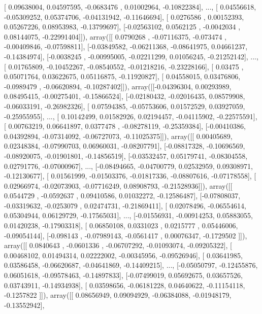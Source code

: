 \documentclass{article}
\begin{document}
       [ 0.09638004,  0.04597595, -0.0683476 ,  0.01002964, -0.10822384],
       ..., 
       [ 0.04556618, -0.05309252,  0.05374706, -0.04131942, -0.11646694],
       [ 0.0276586 ,  0.00152393,  0.05267226,  0.08953983, -0.13799697],
       [-0.02563102,  0.0562125 , -0.0042034 ,  0.08144075, -0.22991404]]), array([[ 0.0790268 , -0.07116375, -0.073474  , -0.00409846, -0.07598811],
       [-0.03849582, -0.06211368, -0.08641975,  0.04661237, -0.14384974],
       [-0.0038245 , -0.00995005, -0.02211299,  0.01056245, -0.21252142],
       ..., 
       [ 0.01765809, -0.10452267, -0.08540552, -0.01218216, -0.23228166],
       [ 0.03475   ,  0.05071764,  0.03622675,  0.05116875, -0.11920827],
       [ 0.04558015,  0.03476806, -0.0989479 , -0.06620894, -0.10287402]]), array([[-0.04396304,  0.00293989,  0.08495415, -0.00275401, -0.15866524],
       [-0.02180432, -0.02016435,  0.08579908, -0.06033191, -0.26982326],
       [ 0.07594385, -0.05753606,  0.01572529,  0.03927059, -0.25955955],
       ..., 
       [ 0.10142499,  0.01582926,  0.02194457, -0.04115902, -0.22575591],
       [ 0.00763219,  0.06641897,  0.0377478 , -0.08278119, -0.25359384],
       [-0.00410386,  0.04392894, -0.07314092, -0.06727073, -0.11025375]]), array([[ 0.00405689,  0.02348384, -0.07990703,  0.06960031, -0.08207791],
       [-0.08817328, -0.10696569, -0.08920075, -0.01901801, -0.14856519],
       [-0.03532457,  0.05179741, -0.08304558,  0.02791776, -0.07000967],
       ..., 
       [-0.08494665, -0.04700779,  0.02532959,  0.09308971, -0.12130677],
       [ 0.01561999, -0.01503376, -0.01817336, -0.08807616, -0.07178558],
       [ 0.02966974, -0.02073903, -0.07716249,  0.08908793, -0.21528936]]), array([[ 0.0544729 , -0.0592637 ,  0.09410586,  0.01032272, -0.12586487],
       [-0.07808037, -0.03319632, -0.0253079 ,  0.02474731, -0.21869411],
       [ 0.02078496, -0.06554614,  0.05304944,  0.06129729, -0.17565031],
       ..., 
       [-0.01556931, -0.00914253,  0.05883055,  0.01420238, -0.17903318],
       [ 0.06850108,  0.0331023 ,  0.0215777 ,  0.05446006, -0.09054144],
       [-0.098143  , -0.07989143, -0.0561417 ,  0.00076347, -0.1729502 ]]), array([[ 0.0840643 , -0.0601336 , -0.06707292, -0.01093074, -0.09205322],
       [ 0.00468102,  0.01494314,  0.02222002, -0.00345956, -0.09526946],
       [ 0.03641985,  0.03586458, -0.06620687, -0.04641869, -0.14409215],
       ..., 
       [-0.05050797, -0.12455876,  0.06051618, -0.09578463, -0.14897833],
       [-0.07499019,  0.05692675,  0.03657526,  0.03743911, -0.14934938],
       [ 0.03598656, -0.06181228,  0.04640622, -0.11154118, -0.1257822 ]]), array([[ 0.08656949,  0.09094929, -0.06384088, -0.01948179, -0.13552942],
\end{document}
